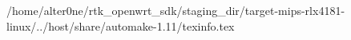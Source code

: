/home/alter0ne/rtk_openwrt_sdk/staging_dir/target-mips-rlx4181-linux/../host/share/automake-1.11/texinfo.tex